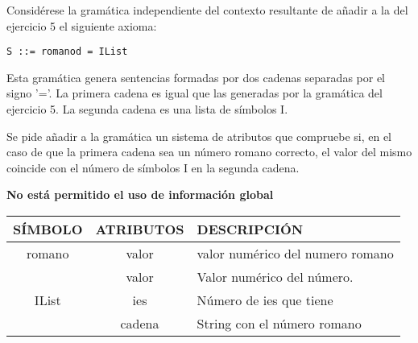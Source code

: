 \begin{problem}[6]
Considérese la gramática independiente del contexto resultante de añadir a la del ejercicio 5 el siguiente axioma:
\begin{verbatim}
S ::= romanod = IList
\end{verbatim}
Esta gramática genera sentencias formadas por dos cadenas separadas por el signo '='. La primera cadena es igual que las generadas por la gramática del ejercicio 5. La segunda cadena es una lista de símbolos I.

Se pide añadir a la gramática un sistema de atributos que compruebe si, en el caso de que la primera cadena sea un número romano correcto, el valor del mismo coincide con el número de símbolos I en la segunda cadena.

\textbf{No está permitido el uso de información global}
\solution
\begin{tabular}{|c|c|l|}
\hline
SÍMBOLO & ATRIBUTOS & DESCRIPCIÓN \\
\hline
romano & valor & valor numérico del numero romano\\
\hline
 & valor & Valor numérico del número. \\
\cline{2-3}
IList & ies & Número de ies que tiene \\
\cline{2-3}
 & cadena & String con el número romano \\
\hline
 
\end{tabular}


\end{problem}
